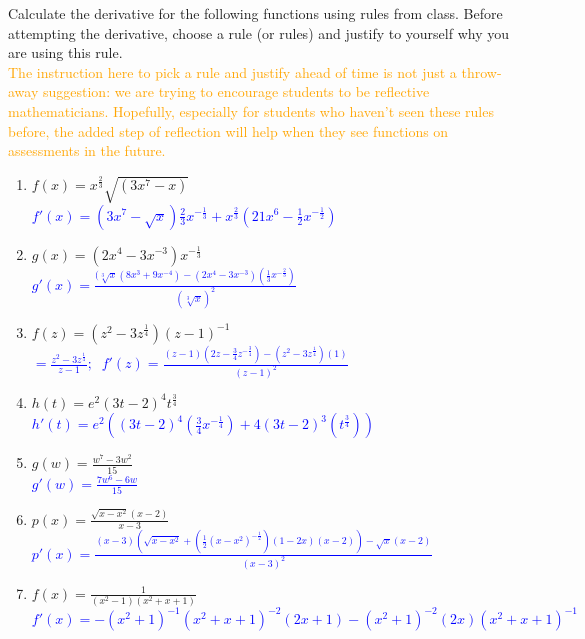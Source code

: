 \documentclass{ximera}
\begin{document}
\begin{exercise}
    Calculate the derivative for the following functions using rules from class.  Before attempting the derivative, choose a rule (or rules) and justify to yourself why you are using this rule. \\
    \textcolor{orange}{The instruction here to pick a rule and justify ahead of time is not just a throw-away suggestion: we are trying to encourage students to be reflective mathematicians.  Hopefully, especially for students who haven't seen these rules before, the added step of reflection will help when they see functions on assessments in the future.}
    \begin{enumerate}
        \item $f(x)=x^{\frac23}\sqrt{(3x^7-x)}$\\
        \textcolor{blue}{ $f'(x)=(3x^7-\sqrt{x})\frac23x^{-\frac13}+x^{\frac23}(21x^6-\frac{1}{2}x^{-\frac{1}{2}})$}

        \item $g(x)=(2x^4-3x^{-3})x^{-\frac{1}{3}}$\\
        \textcolor{blue}{ $g'(x)=\frac{(\sqrt[3]{x}(8x^3+9x^{-4})-(2x^4-3x^{-3})(\frac{1}{3}x^{-\frac{2}{3}})}{(\sqrt[3]{x})^2}$}

        \item $f(z)=(z^2-3z^{\frac{1}{4}})(z-1)^{-1}$\\
        \textcolor{blue}{ $=\frac{z^2-3z^{\frac{1}{4}}}{z-1};\;\; f'(z)=\frac{(z-1)(2z-\frac{3}{4}z^{-\frac{3}{4}})-(z^2-3z^{\frac{1}{4}})(1)}{(z-1)^2}$}

        \item $h(t)=e^2(3t-2)^{4}t^{\frac{3}{4}}$\\
        \textcolor{blue}{ $h'(t)=e^2((3t-2)^{4}(\frac34x^{-\frac14})+4(3t-2)^{3}(t^{\frac34}))$}

        \item $g(w)=\frac{w^7-3w^2}{15}$ \\
        \textcolor{blue}{ $g'(w)=\frac{7w^6-6w}{15}$}

        \item $p(x)=\frac{\sqrt{x-x^2}(x-2)}{x-3}$   \\
        \textcolor{blue}{ $p'(x)=\frac{(x-3)(\sqrt{x-x^2}+(\frac{1}{2}(x-x^2)^{-\frac{1}{2}})(1-2x)(x-2))-\sqrt{x}(x-2)}{(x-3)^2}$}

        \item $f(x)=\frac{1}{(x^2-1)(x^2+x+1)}$\\
        \textcolor{blue}{ $f'(x)=-(x^2+1)^{-1}(x^2+x+1)^{-2}(2x+1)-(x^2+1)^{-2}(2x)(x^2+x+1)^{-1}$}
        

\end{enumerate}
\end{exercise}
\end{document}
